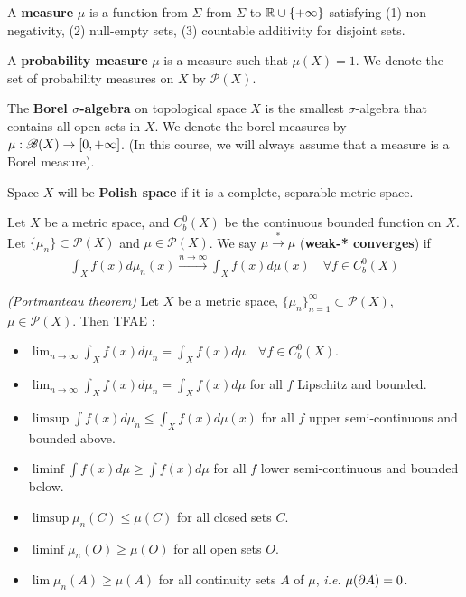 \documentclass[12pt,a4paper]{article}
\renewenvironment{i}
{\begin{itemize} 
	}%
	{\end{itemize}
}
\begin{document}
\quad A \textbf{measure} $\mu$ is a function from $\Sigma$ from $\Sigma$ to $\mathbb{R} \cup \{+ \infty\}$ satisfying (1) non-negativity, (2) null-empty sets, (3) countable additivity for disjoint sets.

\quad A \textbf{probability measure} $\mu$ is a measure such that $\mu(X)=1$. We denote the set of probability measures on $X$ by $\mathscr{P}(X)$.

\quad The \textbf{Borel $\sigma$-algebra} on topological space $X$ is the smallest $\sigma$-algebra that contains all open sets in $X$. We denote the borel measures by $\mu : \mathscr{B}(X) \rightarrow [0, +\infty]$. (In this course, we will always assume that a measure is a Borel measure).

\quad Space $X$ will be \textbf{Polish space} if it is a complete, separable metric space.
\s

 Let $X$ be a metric space, and $C_b^0(X)$ be the continuous bounded function on $X$. Let $\{\mu_n\} \subset \mathscr{P}(X)$ and $\mu\in \mathscr{P}(X)$. We say $\mu \xrightarrow{*} \mu$ (\textbf{weak-* converges}) if
\begin{align*}
\int_X f(x) d\mu_n(x) \xrightarrow{n\rightarrow \infty} \int_X f(x) d\mu(x) \quad \forall f\in C_b^0(X)
\end{align*}
\s

 \emph{(Portmanteau theorem)} Let $X$ be a metric space, $\{\mu_n\}_{n=1}^{\infty} \subset \mathscr{P}(X)$, $\mu \in \mathscr{P}(X)$. Then TFAE :
\begin{i}
\item $\lim_{n\rightarrow \infty} \int_X f(x) d\mu_n =\int_X f(x) d\mu \quad \forall f\in C_b^0(X)$.
\item $\lim_{n\rightarrow \infty} \int_X f(x) d\mu_n =\int_X f(x) d\mu$ for all $f$ Lipschitz and bounded.
\item $\limsup \int f(x) d\mu_n \leq \int_X f(x) d\mu(x)$ for all $f$ upper semi-continuous and bounded above.
\item $\liminf \int f(x) d\mu \geq \int f(x) d\mu$ for all $f$ lower semi-continuous and bounded below.
\item $\limsup \mu_n(C) \leq \mu(C)$ for all closed sets $C$.
\item $\liminf \mu_n(O) \geq \mu(O)$ for all open sets $O$.
\item $\lim \mu_n(A) \geq \mu(A)$ for all continuity sets $A$ of $\mu$, \textit{i.e.} $\mu(\partial A) =0$.
\end{i}
\s
\end{document}

